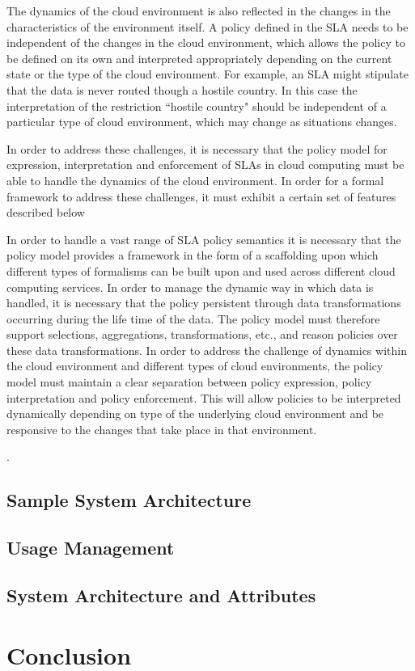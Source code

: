 \documentclass[10pt, conference, compsoc]{IEEEtran}
\begin{document}
The dynamics of the cloud environment is also reflected in the changes in the characteristics of the environment itself. A policy defined in the SLA needs to be independent of the changes in the cloud environment, which allows the policy to be defined on its own and interpreted appropriately depending on the current state or the type of the cloud environment. For example, an SLA might stipulate that the data is never routed though a hostile country. In this case the interpretation of the restriction ``hostile country" should be independent of a particular type of cloud environment, which may change as situations changes. 

In order to address these challenges, it is necessary that the policy model for expression, interpretation and enforcement of SLAs in cloud computing must be able to handle the dynamics of the cloud environment. In order for a formal framework to address these challenges, it must exhibit a certain set of features described below 

In order to handle a vast range of SLA policy semantics it is necessary that the policy model provides a framework in the form of a scaffolding upon which different types of formalisms can be built upon and used across different cloud computing services. In order to manage the dynamic way in which data is handled, it is necessary that the policy persistent through data transformations occurring during the life time of the data. The policy model must therefore support selections, aggregations, transformations, etc., and reason policies over these data transformations. In order to address the challenge of dynamics within the cloud environment and different types of cloud environments, the policy model must maintain a clear separation between policy expression, policy interpretation and policy enforcement. This will allow policies to be interpreted dynamically depending on type of the underlying cloud environment and be responsive to the changes that take place in that environment.  



\cite{Emr:Web:Jade,Emr:Web:Fipa}.
\cite{KoLaMaMi:04,SaShUe:04}

\subsection{Sample System Architecture}

\subsection{Usage Management}
 

\subsection{System Architecture and Attributes}

\section{Conclusion}



\end{document}
